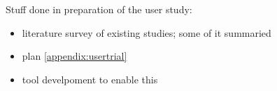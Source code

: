 

Stuff done in preparation of the user study:
\begin{itemize}
  \item literature survey of existing studies; some of it summaried
  \item plan \ref{appendix:usertrial}
  \item tool develpoment to enable this
\end{itemize}



